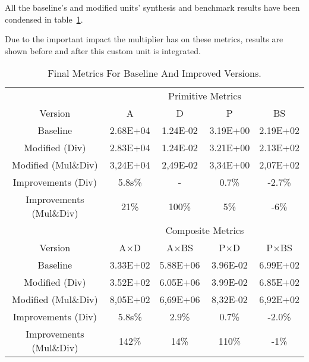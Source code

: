 All the baseline's and modified units' synthesis and benchmark results have been condensed in table~\ref{tbl:final_metrics}.

 Due to the important impact the multiplier has on these metrics, results are shown before and after this custom unit is integrated.

\begin{table}[H]
\centering
\begin{tabular}{ccccc}

&
\multicolumn{4}{c}{Primitive Metrics}\\
Version &
\ttfamily A &
\ttfamily D &
\ttfamily P &
\ttfamily BS \\
Baseline &
\num{2.68E+04} &
\num{1.24E-02} &
\num{3.19E+00} &
\num{2.19E+02} \\
Modified (Div)&
\num{2.83E+04} &
\num{1.24E-02} &
\num{3.21E+00} &
\num{2.13E+02} \\
Modified (Mul\&Div)&
\num{3,24E+04} &
\num{2,49E-02} &
\num{3,34E+00} &
\num{2,07E+02} \\
Improvements (Div) &
\color{red} 5.8s\% &
- &
\color{red} 0.7\% &
\color{green} -2.7\% \\
Improvements (Mul\&Div) &
\color{red} 21\% &
\color{red} 100\% &
\color{red} 5\% &
\color{green} -6\% \\

\midrule

& \multicolumn{4}{c}{Composite Metrics}\\
Version &
\ttfamily A$\times$D &
\ttfamily A$\times$BS &
\ttfamily P$\times$D &
\ttfamily P$\times$BS\\
Baseline &
\num{3.33E+02} &
\num{5.88E+06} &
\num{3.96E-02} &
\num{6.99E+02} \\
Modified (Div)&
\num{3.52E+02} &
\num{6.05E+06} &
\num{3.99E-02} &
\num{6.85E+02} \\
Modified (Mul\&Div)&
\num{8,05E+02} &
\num{6,69E+06} &
\num{8,32E-02} &
\num{6,92E+02} \\
Improvements (Div) &
\color{red} 5.8s\% &
\color{red} 2.9\% &
\color{red} 0.7\% &
\color{green} -2.0\% \\
Improvements (Mul\&Div)&
\color{red} 142\% &
\color{red} 14\% &
\color{red} 110\% &
\color{green} -1\%\\
\end{tabular}
\caption{Final Metrics For Baseline And Improved Versions.}
\label{tbl:final_metrics}
\end{table}